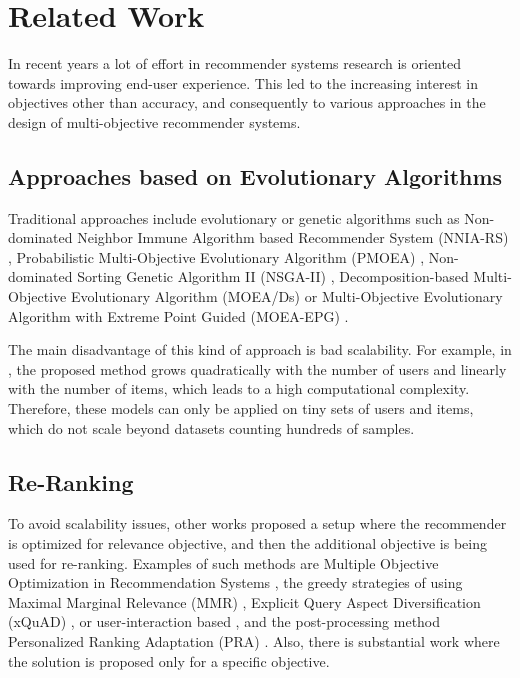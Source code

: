 \documentclass[letterpaper]{article}
\begin{document}
\section{Related Work}
In  recent  years  a  lot  of  effort  in  recommender  systems  research  is  oriented  towards  improving end-user  experience.  This  led  to  the  increasing  interest  in  objectives  other  than accuracy, and consequently to various approaches in the design of multi-objective recommender systems.

\subsection{Approaches based on Evolutionary Algorithms}

Traditional approaches include evolutionary or genetic algorithms such as Non-dominated Neighbor Immune Algorithm based Recommender System (NNIA-RS) \cite{geng2015nnia}, Probabilistic Multi-Objective Evolutionary Algorithm (PMOEA) \cite{CUI201753}, Non-dominated Sorting Genetic Algorithm II (NSGA-II) \cite{Deb:2002:FEM:2221359.2221582}, Decomposition-based Multi-Objective Evolutionary Algorithm (MOEA/Ds) \cite{lin2019evolutionary} or Multi-Objective Evolutionary Algorithm with Extreme Point Guided (MOEA-EPG) \cite{lin2018multiobjective}.

The main disadvantage of this kind of approach is bad scalability. For example, in \cite{lin2018multiobjective}, the proposed method grows quadratically with the number of users and linearly with the number of items, which leads to a high computational complexity. Therefore, these models can only be applied on tiny sets of users and items, which do not scale beyond datasets counting hundreds of samples.

\subsection{Re-Ranking}

To avoid scalability issues, other works proposed a setup where the recommender is optimized for relevance objective, and then the additional objective is being used for re-ranking. Examples of such methods are Multiple Objective Optimization in Recommendation Systems \cite{Rodriguez:2012:MOO:2365952.2365961}, the greedy strategies of \cite{di2017adaptive} using Maximal Marginal Relevance (MMR) \cite{Vargas:2011:RRN:2043932.2043955}, Explicit Query Aspect Diversification (xQuAD) \cite{vargas2013exploiting}, or user-interaction based \cite{Pu2000,Faltings2004a}, and the post-processing method Personalized Ranking Adaptation (PRA) \cite{jugovac2017efficient}. Also, there is substantial work where the solution is proposed only for a specific objective.
\end{document}
